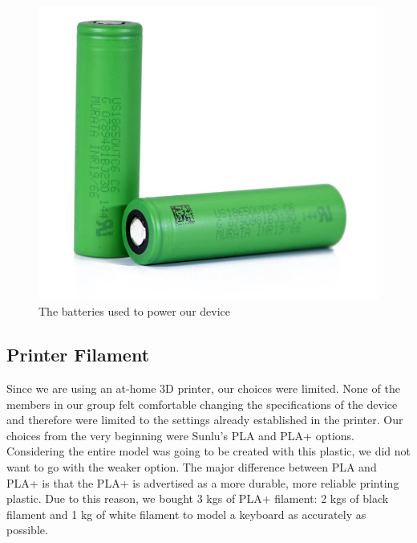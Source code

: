 \begin{figure}[h!]
  \centering
  \includegraphics[width=0.8\linewidth]{image/Batteries.png}
  \caption{The batteries used to power our device}
  \label{fig:batteries}
\end{figure}

\subsection{Printer Filament}

Since we are using an at-home 3D printer, our choices were limited. None of the members in our group felt comfortable changing the specifications of the device and therefore were limited to the settings already established in the printer. Our choices from the very beginning were Sunlu’s PLA and PLA+ options. Considering the entire model was going to be created with this plastic, we did not want to go with the weaker option. The major difference between PLA and PLA+ is that the PLA+ is advertised as a more durable, more reliable printing plastic. Due to this reason, we bought 3 kgs of PLA+ filament: 2 kgs of black filament and 1 kg of white filament to model a keyboard as accurately as possible.
